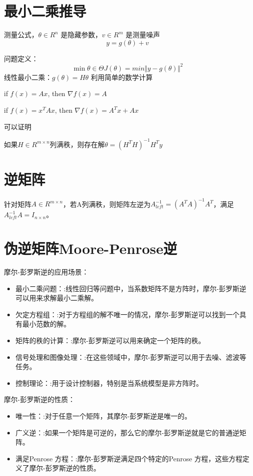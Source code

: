 \section{最小二乘推导}
测量公式，$\theta \in R^n$ 是隐藏参数，$ v \in R^m $ 是测量噪声
\begin{equation}
  y = g(\theta) + v
\end{equation}

问题定义：
\begin{equation}
  \min{\theta \in \Theta}J(\theta) = min \Vert y - g(\theta) \Vert ^2
\end{equation}
线性最小二乘：$g(\theta) = H \theta $
利用简单的数学计算
\begin{theorembox}
	if $f(x) = Ax$, then $\nabla f(x) = A$
\end{theorembox}
\begin{theorembox}
	if $f(x) = x^TAx$, then $\nabla f(x) = A^Tx+Ax$
\end{theorembox}
可以证明
\begin{theorembox}
	如果$H\in R^{m\times n}$列满秩，则存在解$\theta = (H^TH)^{-1}H^Ty$ 
\end{theorembox}
\section{逆矩阵}
\begin{theorembox}
	针对矩阵$A \in R^{m\times n}$，若A列满秩，则矩阵左逆为$A_{left}^{-1} = (A^TA)^{-1}A^T$，满足$A_{left}^{-1}A = I_{n \times n}$。
\end{theorembox}


\section{伪逆矩阵Moore-Penrose逆}
摩尔-彭罗斯逆的应用场景：
\begin{itemize}
  \item 最小二乘问题：:线性回归等问题中，当系数矩阵不是方阵时，摩尔-彭罗斯逆可以用来求解最小二乘解。
  \item 欠定方程组：:对于方程组的解不唯一的情况，摩尔-彭罗斯逆可以找到一个具有最小范数的解。
  \item 矩阵的秩的计算：:摩尔-彭罗斯逆可以用来确定一个矩阵的秩。
  \item 信号处理和图像处理：:在这些领域中，摩尔-彭罗斯逆可以用于去噪、滤波等任务。
  \item 控制理论：:用于设计控制器，特别是当系统模型是非方阵时。﻿
\end{itemize}
摩尔-彭罗斯逆的性质：
\begin{itemize}
  \item 唯一性：:对于任意一个矩阵，其摩尔-彭罗斯逆是唯一的。
  \item 广义逆：:如果一个矩阵是可逆的，那么它的摩尔-彭罗斯逆就是它的普通逆矩阵。
  \item 满足Penrose 方程：:摩尔-彭罗斯逆满足四个特定的Penrose 方程，这些方程定义了摩尔-彭罗斯逆的性质。﻿
\end{itemize}



